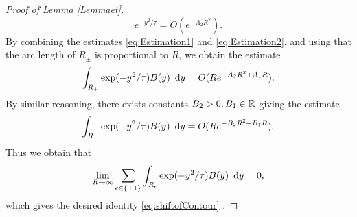 \begin{proof}[Proof of Lemma \ref{Lemmaet}]
\begin{equation}
e^{-y^2/\tau}=O(e^{-A_2R^2}).
\end{equation}
By combining the estimates \eqref{eq:Estimation1} and \eqref{eq:Estimation2}, and using that the arc length of $R_\pm$ is proportional to $R$, we obtain the estimate
\begin{equation}
\int_{R_+} \exp(-y^2/\tau) B(y) \ \operatorname{{d}\hskip-.6mm} y= O(Re^{-A_2R^2+A_1R}).
\end{equation}
By similar reasoning, there exists constants $B_2>0,B_1 \in \mathbb{R}$ giving the estimate
\begin{equation}
\int_{R_-} \exp(-y^2/\tau) B(y) \ \operatorname{{d}\hskip-.6mm} y= O(Re^{-B_2R^2+B_1R}).
\end{equation}
Thus we obtain that
\begin{equation} \label{eq:LimitZero}
\lim_{R \rightarrow \infty} \sum_{\epsilon \in \{\pm1\}} \int_{R_\epsilon} \exp(-y^2/\tau) B(y) \ \operatorname{{d}\hskip-.6mm} y=0,
\end{equation}
which gives the desired identity \eqref{eq:shiftofContour} .


\end{proof}

